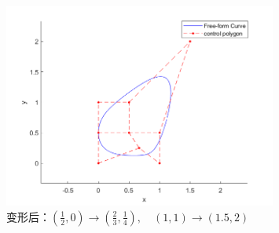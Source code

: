 \documentclass[utf8]{ctexart}
\begin{document}
\begin{figure}[H]
    \centering
    \includegraphics[width=0.8\textwidth]{ffd_2.png}
    \caption{变形后：$(\frac{1}{2}, 0)\to (\frac{2}{3}, \frac{1}{4}), \quad (1, 1)\to (1.5, 2)$}
    \label{fig: ffd_2}
\end{figure}
\end{document}
